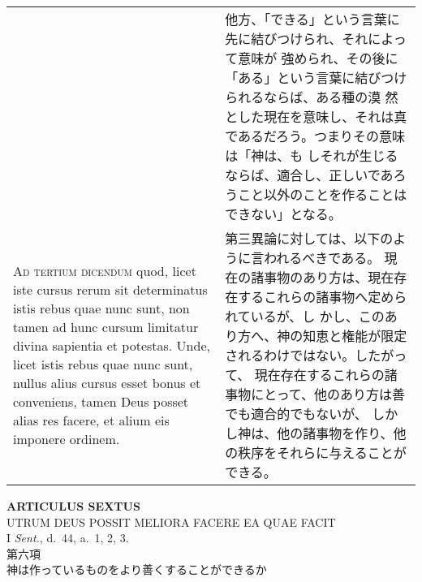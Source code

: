 \documentclass[10pt]{jsarticle} %
\begin{document}
\begin{longtable}{p{21em}p{21em}}
&

他方、「できる」という言葉に先に結びつけられ、それによって意味が
 強められ、その後に「ある」という言葉に結びつけられるならば、ある種の漠
 然とした現在を意味し、それは真であるだろう。つまりその意味は「神は、も
 しそれが生じるならば、適合し、正しいであろうこと以外のことを作ることは
 できない」となる。


\\


{\scshape Ad tertium dicendum} quod, licet iste cursus
rerum sit determinatus istis rebus quae nunc sunt, non tamen ad hunc
cursum limitatur divina sapientia et potestas. Unde, licet istis rebus
quae nunc sunt, nullus alius cursus esset bonus et conveniens, tamen
Deus posset alias res facere, et alium eis imponere ordinem.


&

第三異論に対しては、以下のように言われるべきである。
現在の諸事物のあり方は、現在存在するこれらの諸事物へ定められているが、し
 かし、このあり方へ、神の知恵と権能が限定されるわけではない。したがって、
 現在存在するこれらの諸事物にとって、他のあり方は善でも適合的でもないが、
 しかし神は、他の諸事物を作り、他の秩序をそれらに与えることができる。


\end{longtable}


\newpage
{}
\begin{center}
 {\Large {\bf ARTICULUS SEXTUS}}\\
 {\large UTRUM DEUS POSSIT MELIORA FACERE EA QUAE FACIT}\\
 {\footnotesize I {\itshape Sent.}, d.~44, a.~1, 2, 3.}\\
 {\Large 第六項\\神は作っているものをより善くすることができるか}
\end{center}
\end{document}
